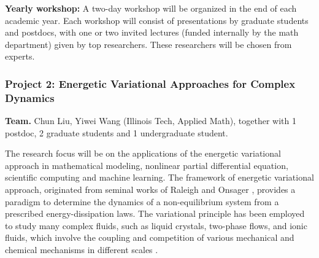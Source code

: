 \documentclass[11pt]{article}
\begin{document}
 \textbf{Yearly workshop:} A two-day workshop will be organized in the end of each academic year. Each workshop will consist   of presentations by graduate
students and postdocs, with one or two invited lectures (funded internally by the math department) given
by top researchers. These researchers will be chosen from experts.   





\subsubsection*{Project 2: Energetic Variational Approaches for Complex Dynamics}
\noindent
{\bf Team.} Chun Liu, Yiwei Wang (Illinois Tech, Applied Math), together with 1 postdoc, 2 graduate students and 1 undergraduate student.

\medskip


 The research focus will be on the applications of the energetic variational approach in mathematical modeling, nonlinear partial differential equation, scientific computing and machine learning. The framework of energetic variational approach, originated from seminal works of Raleigh \cite{strutt1871some} and Onsager \cite{onsager1931reciprocal,onsager1931reciprocal2}, provides a paradigm to determine the dynamics of a non-equilibrium system from a prescribed energy-dissipation laws.%
 The variational principle has been employed to study many complex fluids, such as liquid crystals, two-phase flows, and ionic fluids, which  involve the coupling and competition of various mechanical and chemical mechanisms in different scales \cite{lin2001static, feng2005energetic, LiLiZh05, Lin2007, liu2009introduction, du2009energetic, sun2009energetic, eisenberg2010energy, Giga2017, Liu2019, knopf2020phase}.
\end{document}
